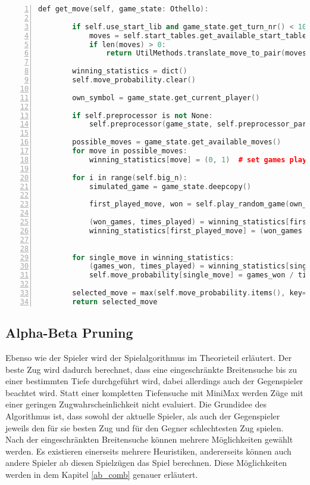 \begin{lstlisting}[caption = {get\_move Funktion des Alpha-Beta Spielers}, language = cpp, captionpos = t , numbers=left, label={lst:ab1}]
    def get_move(self, game_state: Othello):

        if self.use_start_lib and game_state.get_turn_nr() < 10:  # check whether start move match
            moves = self.start_tables.get_available_start_tables(game_state)
            if len(moves) > 0:
                return UtilMethods.translate_move_to_pair(moves[random.randrange(len(moves))])

        winning_statistics = dict()
        self.move_probability.clear()

        own_symbol = game_state.get_current_player()

        if self.preprocessor is not None:
            self.preprocessor(game_state, self.preprocessor_parameter, self.heuristic)

        possible_moves = game_state.get_available_moves()
        for move in possible_moves:
            winning_statistics[move] = (0, 1)  # set games played to 1 to avoid division by zero error

        for i in range(self.big_n):
            simulated_game = game_state.deepcopy()

            first_played_move, won = self.play_random_game(own_symbol, simulated_game)

            (won_games, times_played) = winning_statistics[first_played_move]
            winning_statistics[first_played_move] = (won_games + won, times_played + 1)


        for single_move in winning_statistics:
            (games_won, times_played) = winning_statistics[single_move]
            self.move_probability[single_move] = games_won / times_played

        selected_move = max(self.move_probability.items(), key=operator.itemgetter(1))[0]
        return selected_move
\end{lstlisting}

\subsection{Alpha-Beta Pruning}
Ebenso wie der Spieler  wird der Spielalgorithmus im Theorieteil erläutert. Der beste Zug wird dadurch berechnet, dass eine eingeschränkte Breitensuche bis zu einer bestimmten Tiefe durchgeführt wird, dabei allerdings auch der Gegenspieler beachtet wird.
Statt einer kompletten Tiefensuche mit MiniMax werden Züge mit einer geringen Zugwahrscheinlichkeit nicht evaluiert. Die Grundidee des Algorithmus ist, dass sowohl der aktuelle Spieler, als auch der Gegenspieler jeweils den für sie besten Zug und für den Gegner schlechtesten Zug spielen.
\\Nach der eingeschränkten Breitensuche können mehrere Möglichkeiten gewählt werden.
Es existieren einerseits mehrere Heuristiken, andererseits können auch andere Spieler ab diesen Spielzügen das Spiel berechnen. Diese Möglichkeiten werden in dem Kapitel \ref{ab_comb} genauer erläutert.

